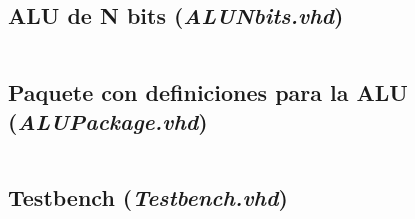 \documentclass[11pt]{article}
\begin{document}
\subsection{ALU de N bits (\textit{ALUNbits.vhd})}
\inputminted[frame=lines, framesep=4mm]{vhdl}{src/ALUNbits.vhd}

\subsection{Paquete con definiciones para la ALU (\textit{ALUPackage.vhd})}
\inputminted[frame=lines, framesep=4mm]{vhdl}{src/ALUPackage.vhd}

\subsection{Testbench (\textit{Testbench.vhd})}
\inputminted[frame=lines, framesep=4mm]{vhdl}{src/Testbench.vhd}
\end{document}
